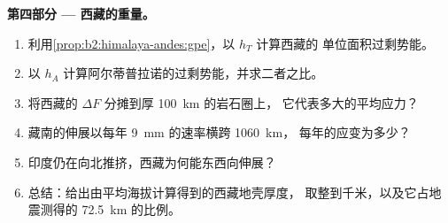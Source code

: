 \begin{problem}
\noindent\textbf{第四部分 --- 西藏的重量。}
\begin{enumerate}[resume]
\item 利用\cref{prop:b2:himalaya-andes:gpe}，以 $h_T$ 计算西藏的
单位面积过剩势能。
\item 以 $h_A$ 计算阿尔蒂普拉诺的过剩势能，并求二者之比。
\item 将西藏的 $\Delta F$ 分摊到厚 \qty{100}{km} 的岩石圈上，
它代表多大的平均应力？
\item 藏南的伸展以每年 \qty{9}{mm} 的速率横跨 \qty{1060}{km}，
每年的应变为多少？
\item 印度仍在向北推挤，西藏为何能东西向伸展？
\item 总结：给出由平均海拔计算得到的西藏地壳厚度，
取整到千米，以及它占地震测得的 \qty{72.5}{km} 的比例。
\end{enumerate}
\end{problem}
